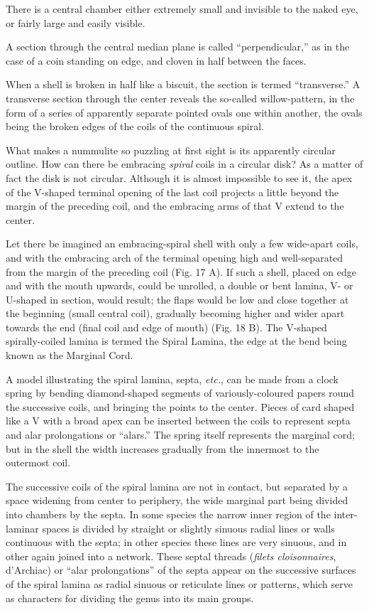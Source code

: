\documentclass[a4paper, 12pt, oneside]{article}
\begin{document}
There is a central chamber either extremely small and invisible to the naked eye, or fairly large and easily visible.

A section through the central median plane is called ``perpendicular,'' as in the case of a coin standing on edge, and cloven in half between the faces.

When a shell is broken in half like a biscuit, the section is termed ``transverse.'' A transverse section through the center reveals the so-called willow-pattern, in the form of a series of apparently separate pointed ovals one within another, the ovals being the broken edges of the coils of the continuous spiral.

What makes a nummulite so puzzling at first sight is its apparently circular outline. How can there be embracing \emph{spiral} coils in a circular disk? As a matter of fact the disk is not circular. Although it is almost impossible to see it, the apex of the V-shaped terminal opening of the last coil projects a little beyond the margin of the preceding coil, and the embracing arms of that V extend to the center.

Let there be imagined an embracing-spiral shell with only a few wide-apart coils, and with the embracing arch of the terminal opening high and well-separated from the margin of the preceding coil (Fig. 17 A). If such a shell, placed on edge and with the mouth upwards, could be unrolled, a double or bent lamina, V- or U-shaped in section, would result; the flaps would be low and close together at the beginning (small central coil), gradually becoming higher and wider apart towards the end (final coil and edge of mouth) (Fig. 18 B). The V-shaped spirally-coiled lamina is termed the Spiral Lamina, the edge at the bend being known as the Marginal Cord.

A model illustrating the spiral lamina, septa, \emph{etc.}, can be made from a clock spring by bending diamond-shaped segments of variously-coloured papers round the successive coils, and bringing the points to the center. Pieces of card shaped like a V with a broad apex can be inserted between the coils to represent septa and alar prolongations or ``alars.'' The spring itself represents the marginal cord; but in the shell the width increases gradually from the innermost to the outermost coil.

The successive coils of the spiral lamina are not in contact, but separated by a space widening from center to periphery, the wide marginal part being divided into chambers by the septa. In some species the narrow inner region of the inter-laminar spaces is divided by straight or slightly sinuous radial lines or walls continuous with the septa; in other species these lines are very sinuous, and in other again joined into a network. These septal threads (\emph{filets cloisonnaires}, d'Archiac) or ``alar prolongations'' of the septa appear on the successive surfaces of the spiral lamina as radial sinuous or reticulate lines or patterns, which serve as characters for dividing the genus into its main groups.
\end{document}
